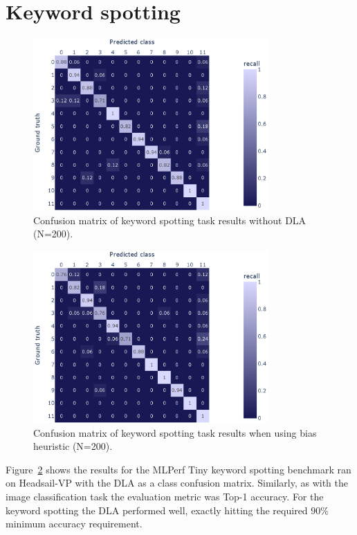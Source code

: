 \documentclass[12pt,a4paper,english
]{tunithesis}
\begin{document}
\section{Keyword spotting}

\begin{figure}[h]
  \centering
  \includegraphics[width=0.8\textwidth]{img/kws_200_no_acc.eps}
  \caption{Confusion matrix of keyword spotting task results without DLA (N=200).}
  \label{fig:kws-results-no-acc}
\end{figure}
\begin{figure}[h]
  \centering
  \includegraphics[width=0.8\textwidth]{img/kws_200_abs_heuristic.eps}
  \caption{Confusion matrix of keyword spotting task results when using bias heuristic (N=200).}
  \label{fig:kws-results}
\end{figure}


Figure~\ref{fig:kws-results} shows the results for the MLPerf Tiny keyword spotting benchmark ran on Headsail-VP with the DLA as a class confusion matrix. Similarly, as with the image classification task the evaluation metric was Top-1 accuracy. For the keyword spotting the DLA performed well, exactly hitting the required $90\%$ minimum accuracy requirement.
\end{document}
